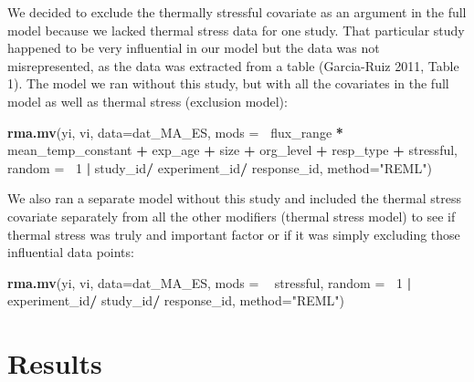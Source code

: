 \documentclass[12pt,twoside]{reedthesis}
\newenvironment{Shaded}{\begin{snugshade}}{\end{snugshade}}
\newcommand{\DataTypeTok}[1]{\textcolor[rgb]{0.13,0.29,0.53}{#1}}
\newcommand{\DecValTok}[1]{\textcolor[rgb]{0.00,0.00,0.81}{#1}}
\newcommand{\KeywordTok}[1]{\textcolor[rgb]{0.13,0.29,0.53}{\textbf{#1}}}
\newcommand{\NormalTok}[1]{#1}
\newcommand{\OperatorTok}[1]{\textcolor[rgb]{0.81,0.36,0.00}{\textbf{#1}}}
\newcommand{\StringTok}[1]{\textcolor[rgb]{0.31,0.60,0.02}{#1}}
\begin{document}
We decided to exclude the thermally stressful covariate as an argument in the full model because we lacked thermal stress data for one study. That particular study happened to be very influential in our model but the data was not misrepresented, as the data was extracted from a table (Garcia-Ruiz 2011, Table 1). The model we ran without this study, but with all the covariates in the full model as well as thermal stress (exclusion model):
\begin{Shaded}
\begin{Highlighting}[]
\KeywordTok{rma.mv}\NormalTok{(yi, vi, }\DataTypeTok{data=}\NormalTok{dat_MA_ES, }\DataTypeTok{mods =} \OperatorTok{~}\NormalTok{flux_range }\OperatorTok{*}\StringTok{ }\NormalTok{mean_temp_constant }
       \OperatorTok{+}\StringTok{ }\NormalTok{exp_age }\OperatorTok{+}\StringTok{ }\NormalTok{size }\OperatorTok{+}\StringTok{ }\NormalTok{org_level }\OperatorTok{+}\StringTok{ }\NormalTok{resp_type }\OperatorTok{+}\StringTok{ }\NormalTok{stressful, }
               \DataTypeTok{random =} \OperatorTok{~}\DecValTok{1} \OperatorTok{|}\StringTok{  }\NormalTok{study_id}\OperatorTok{/}\StringTok{ }\NormalTok{experiment_id}\OperatorTok{/}\StringTok{ }\NormalTok{response_id,}
                 \DataTypeTok{method=}\StringTok{"REML"}\NormalTok{) }
\end{Highlighting}
\end{Shaded}
We also ran a separate model without this study and included the thermal stress covariate separately from all the other modifiers (thermal stress model) to see if thermal stress was truly and important factor or if it was simply excluding those influential data points:
\begin{Shaded}
\begin{Highlighting}[]
\KeywordTok{rma.mv}\NormalTok{(yi, vi, }\DataTypeTok{data=}\NormalTok{dat_MA_ES, }\DataTypeTok{mods =}  \OperatorTok{~}\StringTok{ }\NormalTok{stressful, }
               \DataTypeTok{random =} \OperatorTok{~}\DecValTok{1} \OperatorTok{|}\StringTok{ }\NormalTok{experiment_id}\OperatorTok{/}\StringTok{ }\NormalTok{study_id}\OperatorTok{/}\StringTok{ }\NormalTok{response_id,}
                 \DataTypeTok{method=}\StringTok{"REML"}\NormalTok{) }
\end{Highlighting}
\end{Shaded}
\hypertarget{results}{%
\chapter{Results}\label{results}}
\end{document}
